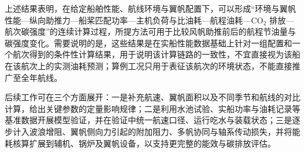 \documentclass[UTF8,a4paper,twoside,zihao=5,fontset=windows]{ctexart}
\begin{document}
上述结果表明，在给定船舶性能、航线环境与翼帆配置下，可以形成“环境与翼帆性能—纵向助推力—船桨匹配功率—主机负荷与比油耗—航程油耗—CO$_2$ 排放—航次碳强度”的连续计算过程，所提方法可用于比较风帆助推前后的航程节油量与碳强度变化。需要说明的是，这些结果是在实船性能数据基础上针对一组配置和一个航次得到的条件性计算结果，用于说明该计算链路的一致性，不宜直接视为该船在该航次上的实测油耗预测；算例工况只用于表征该航次的环境状态，不能直接推广至全年航线。

后续工作可在三个方面展开：一是补充航速、翼帆面积以及不同季节和航线的对比计算，给出关键参数的定量影响规律；二是利用水池试验、实船功率与油耗记录等基准数据开展模型验证，并在验证中统一航速口径、运行吃水与装载状态；三是逐步计入波浪增阻、翼帆侧向力引起的附加阻力、多帆协同与轴系传动损失，并将能耗核算扩展到辅机、锅炉及翼帆设备，以支持更完整的能效与碳排放评估。
\end{document}
